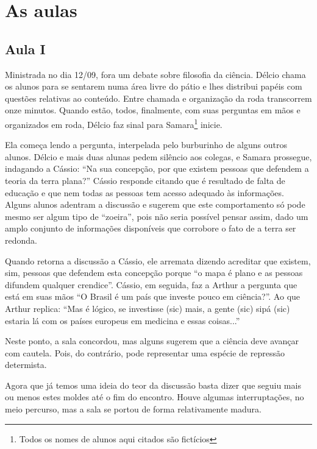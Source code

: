 \documentclass[12pt,a4paper]{article}
\begin{document}
	\newpage
	
	\section{As aulas}

    \subsection*{Aula I}
    
    Ministrada no dia 12/09, fora um debate sobre filosofia da ciência. Délcio 
    chama os alunos para se sentarem numa área livre do pátio e lhes distribui 
    papéis com questões relativas ao conteúdo. Entre chamada e organização da 
    roda transcorrem onze minutos. Quando estão, todos, finalmente, com suas 
    perguntas em mãos e organizados em roda, Délcio faz sinal para 
    Samara\footnote{Todos os nomes de alunos aqui citados são fictícios} 
    inicie. 
    
    Ela começa lendo a pergunta, interpelada pelo burburinho de alguns 
    outros alunos. Délcio e mais duas alunas pedem silêncio aos colegas, e 
    Samara prossegue, indagando a Cássio: ``Na sua concepção, por que existem 
    pessoas que defendem a teoria da terra plana?'' Cássio responde citando 
    que é resultado de falta de educação e que nem todas as pessoas tem acesso 
    adequado às informações. Alguns alunos adentram a discussão e sugerem que 
    este comportamento só pode mesmo ser algum tipo de ``zoeira'', pois não 
    seria possível pensar assim, dado um amplo conjunto de informações 
    disponíveis que corrobore o fato de a terra ser redonda. 
    
    Quando retorna a discussão a Cássio, ele arremata dizendo acreditar que 
    existem, sim, pessoas que defendem esta concepção porque ``o mapa é plano 
    e as pessoas difundem qualquer crendice''. Cássio, em seguida, faz a 
    Arthur a pergunta que está em suas mãos ``O Brasil é um país que 
    investe pouco em ciência?''. Ao que Arthur replica: ``Mas é lógico, 
    se investisse (sic) mais, a gente (sic) sipá (sic) estaria lá com os 
    países europeus em medicina e essas coisas...'' 
    
    Neste ponto, a sala concordou, mas alguns sugerem que a ciência deve 
    avançar com cautela. Pois, do contrário, pode representar uma espécie de 
    repressão determista. 
    
    Agora que já temos uma ideia do teor da discussão basta dizer que seguiu 
    mais ou menos estes moldes até o fim do encontro. Houve algumas 
    interruptações, no meio percurso, mas a sala se portou de forma 
    relativamente madura. 
\end{document}
